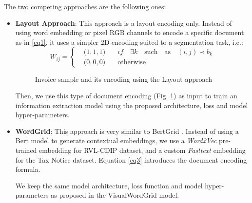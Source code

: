 \documentclass[runningheads]{llncs}
\begin{document}
The two competing approaches are the following ones:
\begin{itemize}
    \item \textbf{Layout Approach}: This approach is a layout encoding only. Instead of using word embedding or pixel RGB channels to encode a specific document as in \eqref{eq1}, it uses a simpler 2D encoding suited to a segmentation task, i.e.:
 \begin{equation}
    W_{ij}=\left\{\begin{array}{rcl}
    & ( 1, 1, 1 \big) \quad & if \quad \exists k \quad \text{such} \quad \text{as} \quad (i,j) \prec b_k \\
    & (0, 0, 0\big)   \quad & \text{otherwise}
\end{array}\right.
\label{eq10}
\end{equation}

\begin{figure}[!h]
\begin{minipage}[t]{0.5\linewidth}
    \centering
    {\setlength{\fboxsep}{0pt}\setlength{\fboxrule}{1pt}}\label{f11}
\end{minipage}
\hspace{0.1cm}
\begin{minipage}[t]{0.5\linewidth} 
    \centering
     {\setlength{\fboxsep}{0pt}\setlength{\fboxrule}{1pt}}\label{f22}
\end{minipage}        
\caption{Invoice sample and its encoding using the Layout approach}
\label{fig:layout}
\end{figure}  


Then, we use this type of document encoding (Fig. \ref{fig:layout}) as input to train an information extraction model  using the proposed architecture, loss and model hyper-parameters. 

\item \textbf{WordGrid}: This approach is very similar to BertGrid \cite{bertgrid}. Instead of using a Bert \cite{bert} model to generate contextual embeddings, we use a \textit{Word2Vec} pre-trained embedding for RVL-CDIP dataset, and  a custom \textit{Fasttext} embedding for the Tax Notice dataset. Equation \eqref{eq3} introduces the document encoding formula. 

We keep the same model architecture, loss function and model hyper-parameters as  proposed in the VisualWordGrid model.





\end{itemize}
\end{document}
